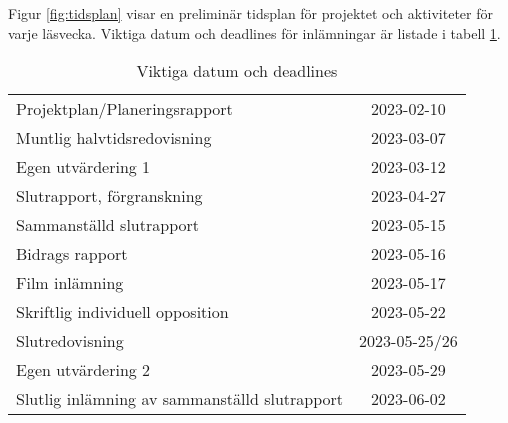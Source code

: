 Figur \ref{fig:tidsplan} visar en preliminär tidsplan för projektet och
aktiviteter för varje läsvecka. Viktiga datum och deadlines för inlämningar är
listade i tabell \ref{tab:deadlines}.


\begin{table}[h]
\caption{Viktiga datum och deadlines}
\begin{center}
\begin{tabular}{| l | c |}
    \hline
Projektplan/Planeringsrapport                        &  2023-02-10\\ 
Muntlig halvtidsredovisning                          &  2023-03-07\\ 
Egen utvärdering 1                                   &  2023-03-12\\ 
Slutrapport, förgranskning                           &  2023-04-27\\ 
Sammanställd slutrapport                             &  2023-05-15\\ 
Bidrags rapport                                      &  2023-05-16\\ 
Film inlämning                                       &  2023-05-17\\ 
Skriftlig individuell opposition                     &  2023-05-22\\ 
Slutredovisning                                      &  2023-05-25/26\\ 
Egen utvärdering 2                                   &  2023-05-29\\ 
Slutlig inlämning av sammanställd slutrapport        &  2023-06-02\\ 
    \hline
\end{tabular}
\label{tab:deadlines}
\end{center}
\end{table}


